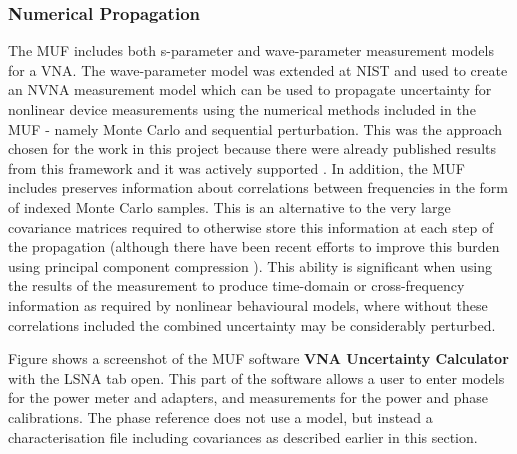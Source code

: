 \documentclass[../thesis/thesis.tex]{subfiles}
\begin{document}
\begin{refsection}
\subsubsection{Numerical Propagation}

The MUF includes both s-parameter and wave-parameter measurement models for a VNA. The wave-parameter model was extended at NIST and used to create an NVNA measurement model which can be used to propagate uncertainty for nonlinear device measurements using the numerical methods included in the MUF - namely Monte Carlo and sequential perturbation. This was the approach chosen for the work in this project because there were already published results from this framework and it was actively supported \cite{Avolio_2015}. In addition, the MUF includes preserves information about correlations between frequencies in the form of indexed Monte Carlo samples. This is an alternative to the very large covariance matrices required to otherwise store this information at each step of the propagation (although there have been recent efforts to improve this burden using principal component compression \cite{Humphreys_2015}). This ability is significant when using the results of the measurement to produce time-domain or cross-frequency information as required by nonlinear behavioural models, where without these correlations included the combined uncertainty may be considerably perturbed.

Figure shows a screenshot of the MUF software \textbf{VNA Uncertainty Calculator} with the LSNA tab open. This part of the software allows a user to enter models for the power meter and adapters, and measurements for the power and phase calibrations. The phase reference does not use a model, but instead a characterisation file including covariances as described earlier in this section.


\end{refsection}
\end{document}
